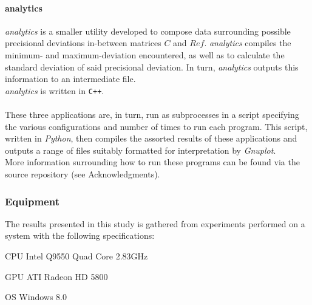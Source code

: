 \documentclass[fleqn,10pt]{SelfArx} %
\begin{document}
\paragraph{analytics}
\textit{analytics} is a smaller utility developed to compose data surrounding possible precisional deviations in-between matrices $C$ and $Ref$. \textit{analytics} compiles the minimum- and maximum-deviation encountered, as well as to calculate the standard deviation of said precisional deviation. In turn, \textit{analytics} outputs this information to an intermediate file.\\
\textit{analytics} is written in \texttt{C++}.\\
\\
\noindent
These three applications are, in turn, run as subprocesses in a script specifying the various configurations and number of times to run each program. This script, written in \textit{Python}, then compiles the assorted results of these applications and outputs a range of files suitably formatted for interpretation by \textit{Gnuplot}.\\
More information surrounding how to run these programs can be found via the source repository (see Acknowledgments).

\subsubsection{Equipment}
\label{sec:contribution:equipment}
The results presented in this study is gathered from experiments performed on a system with the following specifications:
\begin{description*}
	\item[CPU]	Intel Q9550 Quad Core 2.83GHz
	\item[GPU]	ATI Radeon HD 5800
	\item[OS]	Windows 8.0
\end{description*}

\end{document}
